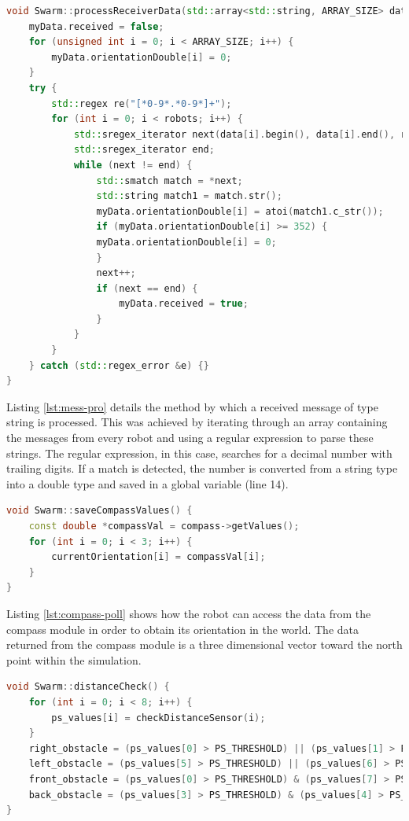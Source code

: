 \clearpage

\begin{lstlisting}[language=C++, caption={Message processing},label={lst:mess-pro}]
void Swarm::processReceiverData(std::array<std::string, ARRAY_SIZE> data) {
	myData.received = false;
	for (unsigned int i = 0; i < ARRAY_SIZE; i++) {
		myData.orientationDouble[i] = 0;
	}
	try {
		std::regex re("[*0-9*.*0-9*]+");
		for (int i = 0; i < robots; i++) {
			std::sregex_iterator next(data[i].begin(), data[i].end(), re);
			std::sregex_iterator end;
			while (next != end) {
				std::smatch match = *next;
				std::string match1 = match.str();
				myData.orientationDouble[i] = atoi(match1.c_str());
				if (myData.orientationDouble[i] >= 352) {
				myData.orientationDouble[i] = 0;
				}
				next++;
				if (next == end) {
					myData.received = true;
				}
			}
		}
	} catch (std::regex_error &e) {}
}
\end{lstlisting}

Listing \ref{lst:mess-pro} details the method by which a received message of type string is processed. This was achieved by iterating through an array containing the messages from every robot and using a regular expression to parse these strings. The regular expression, in this case, searches for a decimal number with trailing digits. If a match is detected, the number is converted from a string type into a double type and saved in a global variable (line 14).


\begin{lstlisting}[language=C++, caption={Getting orientation data},label={lst:compass-poll}]
void Swarm::saveCompassValues() {
	const double *compassVal = compass->getValues();
	for (int i = 0; i < 3; i++) {
		currentOrientation[i] = compassVal[i];
	}
}
\end{lstlisting}

Listing \ref{lst:compass-poll} shows how the robot can access the data from the compass module in order to obtain its orientation in the world. The data returned from the compass module is a three dimensional vector toward the north point within the simulation.

\begin{lstlisting}[language=C++, caption={Getting proximity information},label={lst:prox}]
void Swarm::distanceCheck() {
	for (int i = 0; i < 8; i++) {
		ps_values[i] = checkDistanceSensor(i);
	}
	right_obstacle = (ps_values[0] > PS_THRESHOLD) || (ps_values[1] > PS_THRESHOLD) || (ps_values[2] > PS_THRESHOLD);
	left_obstacle = (ps_values[5] > PS_THRESHOLD) || (ps_values[6] > PS_THRESHOLD) || (ps_values[7] > PS_THRESHOLD);
	front_obstacle = (ps_values[0] > PS_THRESHOLD) & (ps_values[7] > PS_THRESHOLD);
	back_obstacle = (ps_values[3] > PS_THRESHOLD) & (ps_values[4] > PS_THRESHOLD);
}
\end{lstlisting}

